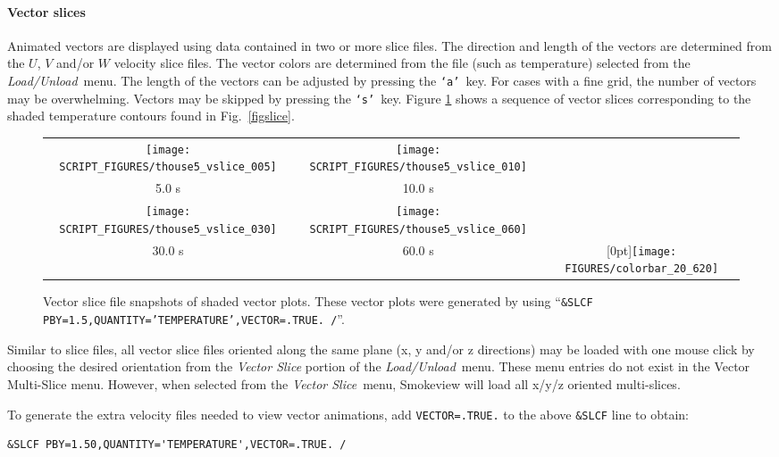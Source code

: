 \documentclass[11pt,twoside]{book}
\begin{document}
\paragraph{Vector slices}Animated vectors are displayed using data contained in two or more
slice files.  The direction and length of the vectors are
determined from the $U$, $V$ and/or $W$ velocity slice files. The
vector colors are determined from the file (such as temperature)
selected from the {\em Load/Unload}\ menu. The length of the
vectors can be adjusted by pressing the {\tt `a'}\ key. For cases
with a fine grid, the number of vectors may be overwhelming.
Vectors may be skipped by pressing the {\tt `s'}\ key.  Figure
\ref{figvslice} shows a sequence of vector slices corresponding to
the shaded temperature contours found in Fig.~\ref{figslice}.

\begin{figure}[\figoptions]
\begin{center}
\begin{tabular}{ccc}
\texttt{[image: SCRIPT\_FIGURES/thouse5\_vslice\_005]}&
\texttt{[image: SCRIPT\_FIGURES/thouse5\_vslice\_010]}\\
5.0 s&10.0 s\\
\texttt{[image: SCRIPT\_FIGURES/thouse5\_vslice\_030]}&
\texttt{[image: SCRIPT\_FIGURES/thouse5\_vslice\_060]}\\
30.0 s&60.0 s
&\raisebox{0.0ex}[0pt]{\texttt{[image: FIGURES/colorbar\_20\_620]}}\\
\end{tabular}
\end{center}
\caption [Vector slice file snapshots of shaded vector plots.]
{Vector slice file snapshots of shaded vector plots. These vector
plots were generated by using ``{\tt \&SLCF
PBY=1.5,QUANTITY='TEMPERATURE',VECTOR=.TRUE. /}''.}
\label{figvslice}%
\end{figure}

Similar to slice files, all vector slice files oriented along the same plane (x, y and/or z directions) may be loaded
with one mouse click by choosing the desired orientation from the {\em Vector Slice}
portion of the {\em Load/Unload}\ menu.  These menu entries do not exist in the Vector Multi-Slice menu.
However, when selected from the {\em Vector Slice}\ menu, Smokeview will load all x/y/z oriented multi-slices.

To generate the extra velocity files needed to view vector
animations, add {\tt VECTOR=.TRUE.} to the above {\tt \&SLCF} line
to obtain:
\begin{lstlisting}
&SLCF PBY=1.50,QUANTITY='TEMPERATURE',VECTOR=.TRUE. /
\end{lstlisting}
\end{document}
